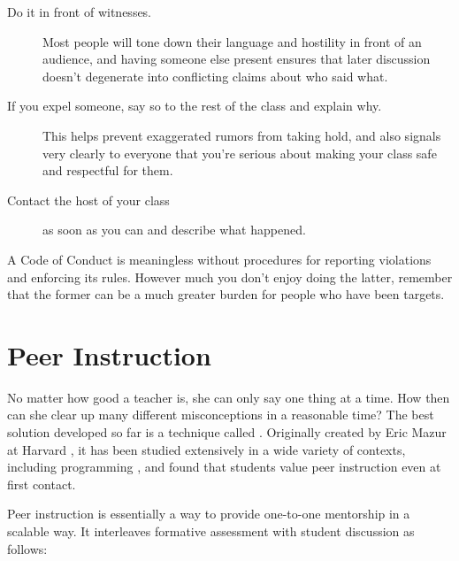 \begin{description}

  \item[Do it in front of witnesses.] Most people will tone down their
    language and hostility in front of an audience, and having someone
    else present ensures that later discussion doesn't degenerate into
    conflicting claims about who said what.

  \item[If you expel someone, say so to the rest of the class and
    explain why.] This helps prevent exaggerated rumors from taking
    hold, and also signals very clearly to everyone that you're serious
    about making your class safe and respectful for them.

  \item[Contact the host of your class] as soon as you can and
    describe what happened.

\end{description}

A Code of Conduct is meaningless without procedures for reporting
violations and enforcing its rules.  However much you don't enjoy
doing the latter, remember that the former can be a much greater
burden for people who have been targets.

\section{Peer Instruction}\label{s:classroom-peer}

No matter how good a teacher is, she can only say one thing at a time.
How then can she clear up many different misconceptions in a
reasonable time?  The best solution developed so far is a technique
called . Originally
created by Eric Mazur at Harvard \cite{Mazu1996}, it has been studied
extensively in a wide variety of contexts, including programming
\cite{Crou2001,Port2013}, and \cite{Port2016} found that students
value peer instruction even at first contact.

Peer instruction is essentially a way to provide one-to-one mentorship
in a scalable way.  It interleaves formative assessment with student
discussion as follows:

